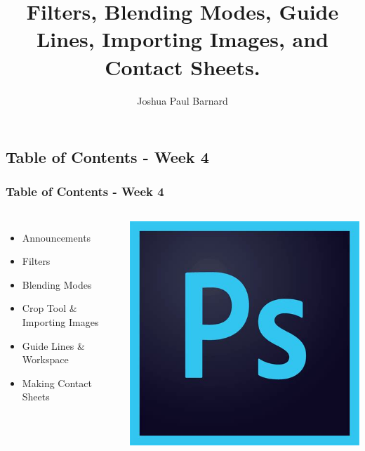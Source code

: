 \documentclass{beamer}
\title{Filters, Blending Modes, Guide Lines, Importing Images, and Contact Sheets.}
\author{Joshua Paul Barnard}
\date{\vspace{-5em}}
\begin{document}
	{
		\begin{frame}
			\vspace{-35pt}
			\maketitle
		\end{frame}
	}

	\section{}	
\subsection{Table of Contents - Week 4}
\begin{frame}
	\frametitle{Table of Contents - Week 4}
	\begin{columns}
		\column{.6\textwidth}
		\vspace{-25pt}
		\begin{itemize}
			\item Announcements
			\item Filters
			\item Blending Modes
			\item Crop Tool \& Importing Images
			\item Guide Lines \& Workspace
			\item Making Contact Sheets
		\end{itemize}
		\column{.45\textwidth}
		\includegraphics[width=.85\textwidth]{images/ps.jpg}
	\end{columns}
\end{frame}
\end{document}
